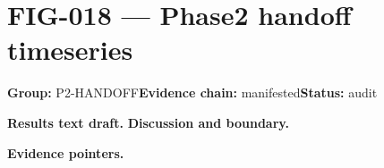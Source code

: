 \clearpage
\section{FIG-018 --- Phase2 handoff timeseries}
\label{figpage:fig-018}
\textbf{Group:} P2-HANDOFF\quad \textbf{Evidence chain:} manifested\quad \textbf{Status:} audit

\textbf{Results text draft.} 
\textbf{Discussion and boundary.} 


\textbf{Evidence pointers.}



\vfill

